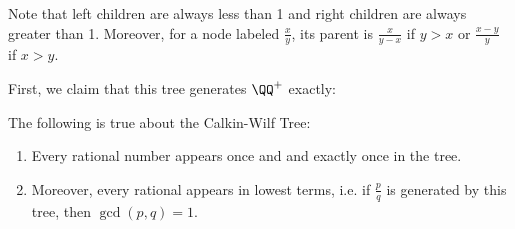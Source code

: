 \documentclass[12pt]{scrartcl}
\begin{document}
Note that left children are always less than 1 and right children are always greater than 1. Moreover, for a node labeled $\frac{x}{y}$, its parent is $\frac{x}{y-x}$ if $y > x$ or $\frac{x-y}{y}$ if $x > y$.

First, we claim that this tree generates $\QQ^+$ exactly:
\begin{theorem}
	The following is true about the Calkin-Wilf Tree:
	\begin{enumerate}
		\item Every rational number appears once and and exactly once in the tree.
		\item Moreover, every rational appears in lowest terms, i.e. if $\frac pq$ is generated by this tree, then $\gcd(p, q) = 1$.
	\end{enumerate}
\end{theorem}
\end{document}
